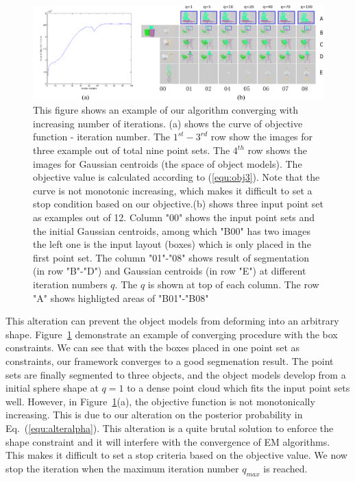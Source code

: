 \begin{figure}
	\centering
	\includegraphics[width=\linewidth]{images/Initialization/iters_merge}
	\caption{\label{fig:iter} This figure shows an example of our algorithm converging with increasing number of iterations.
		(a) shows the curve of objective function - iteration number. The $1^{st}-3^{rd}$ row show the images for three example out of total nine point sets. The $4^{th}$ row shows the images for Gaussian centroids (the space of object models). The objective value is calculated according to (\ref{equ:obj3}). Note that the curve is not monotonic increasing, which makes it difficult to set a stop condition based on our objective.(b) shows three input point set as examples out of 12. Column "00" shows the input point sets and the initial Gaussian centroids, among which "B00" has two images the left one  is the input layout (boxes) which is only placed in the first point set. The column "01"-"08" shows result of segmentation (in row "B"-"D") and Gaussian centroids (in row "E") at different iteration numbers $q$. The $q$ is shown at top of each column. The row "A" shows highligted areas of "B01"-"B08" }
\end{figure}

This alteration can prevent the object models from deforming into an arbitrary shape.
%
%
Figure~\ref{fig:iter} demonstrate an example of converging procedure with the box constraints. 
%
We can see that with the boxes placed in one point set as constraints, our framework converges to a good segmenation result. The point sets are finally segmented to three objects, and the object models develop from a initial sphere shape at $q=1$ to a dense point cloud which fits the input point sets well. 
%
However, in Figure~\ref{fig:iter}(a), the objective function is not monotonically increasing. 
This is due to our alteration on the posterior probability in Eq.~(\ref{equ:alteralpha}). This alteration is a quite brutal solution to enforce the shape constraint and it will interfere with the convergence of EM algorithms.
% 
This makes it difficult to set a stop criteria based on the objective value. 
We now stop the iteration when the maximum iteration number $q_{max}$ is reached.
 
